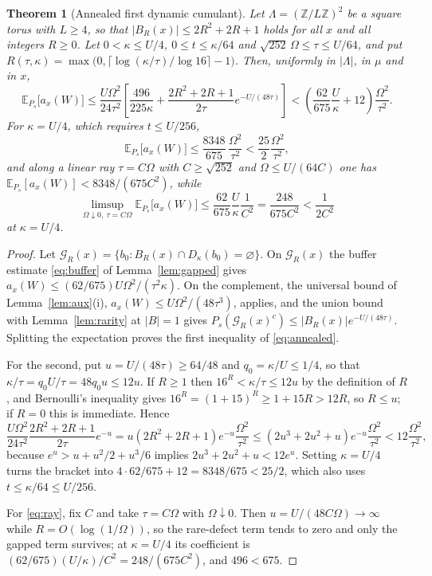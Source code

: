 \documentclass[11pt]{article}
\newtheorem{theorem}{Theorem}[section]
\theoremstyle{definition}
\theoremstyle{remark}
\newcommand{\E}{\mathbb{E}}
\begin{document}
\begin{theorem}[Annealed first dynamic cumulant]
\label{thm:annealed}
Let $\Lambda=(\mathbb{Z}/L\mathbb{Z})^2$ be a square torus with $L\ge4$, so that
$|B_R(x)|\le2R^2+2R+1$ holds for all $x$ and all integers $R\ge0$. Let
$0<\kappa\le U/4$, $0\le t\le\kappa/64$ and $\sqrt{252}\,\Omega\le\tau\le U/64$, and
put $R(\tau,\kappa)=\max\bigl(0,\lceil\log(\kappa/\tau)/\log16\rceil-1\bigr)$. Then,
uniformly in $|\Lambda|$, in $\mu$ and in $x$,
\begin{equation}
\E_{P_s}\bigl[a_x(W)\bigr]
\le\frac{U\Omega^2}{24\tau^2}\left[\frac{496}{225\kappa}
+\frac{2R^2+2R+1}{2\tau}e^{-U/(48\tau)}\right]
<\left(\frac{62}{675}\frac{U}{\kappa}+12\right)\frac{\Omega^2}{\tau^2}.
\label{eq:annealed}
\end{equation}
For $\kappa=U/4$, which requires $t\le U/256$,
\begin{equation}
\E_{P_s}\bigl[a_x(W)\bigr]\le\frac{8348}{675}\,\frac{\Omega^2}{\tau^2}<\frac{25}{2}\frac{\Omega^2}{\tau^2},
\label{eq:annealed4}
\end{equation}
and along a linear ray $\tau=C\Omega$ with $C\ge\sqrt{252}$ and $\Omega\le U/(64C)$
one has $\E_{P_s}[a_x(W)]<8348/(675C^2)$, while
\begin{equation}
\limsup_{\Omega\downarrow0,\ \tau=C\Omega}\E_{P_s}\bigl[a_x(W)\bigr]
\le\frac{62}{675}\frac{U}{\kappa}\frac{1}{C^2}=\frac{248}{675C^2}<\frac{1}{2C^2}
\label{eq:ray}
\end{equation}
at $\kappa=U/4$.
\end{theorem}

\begin{proof}
Let $\mathcal{G}_R(x)=\{b_0:B_R(x)\cap D_\kappa(b_0)=\varnothing\}$. On
$\mathcal{G}_R(x)$ the buffer estimate \eqref{eq:buffer} of
Lemma~\ref{lem:gapped} gives $a_x(W)\le(62/675)U\Omega^2/(\tau^2\kappa)$. On the
complement, the universal bound of Lemma~\ref{lem:aux}(i),
$a_x(W)\le U\Omega^2/(48\tau^3)$, applies, and the union bound with
Lemma~\ref{lem:rarity} at $|B|=1$ gives
$P_s(\mathcal{G}_R(x)^c)\le|B_R(x)|e^{-U/(48\tau)}$. Splitting the expectation
proves the first inequality of \eqref{eq:annealed}.

For the second, put $u=U/(48\tau)\ge64/48$ and $q_0=\kappa/U\le1/4$, so that
$\kappa/\tau=q_0U/\tau=48q_0u\le12u$. If $R\ge1$ then $16^R<\kappa/\tau\le12u$ by the
definition of $R$, and Bernoulli's inequality gives $16^R=(1+15)^R\ge1+15R>12R$, so
$R\le u$; if $R=0$ this is immediate. Hence
\[
\frac{U\Omega^2}{24\tau^2}\frac{2R^2+2R+1}{2\tau}e^{-u}
=u(2R^2+2R+1)e^{-u}\frac{\Omega^2}{\tau^2}
\le(2u^3+2u^2+u)e^{-u}\frac{\Omega^2}{\tau^2}<12\frac{\Omega^2}{\tau^2},
\]
because $e^u>u+u^2/2+u^3/6$ implies $2u^3+2u^2+u<12e^u$. Setting $\kappa=U/4$
turns the bracket into $4\cdot62/675+12=8348/675<25/2$, which also uses
$t\le\kappa/64\le U/256$.

For \eqref{eq:ray}, fix $C$ and take $\tau=C\Omega$ with $\Omega\downarrow0$. Then
$u=U/(48C\Omega)\to\infty$ while $R=O(\log(1/\Omega))$, so the rare-defect term
tends to zero and only the gapped term survives; at $\kappa=U/4$ its coefficient is
$(62/675)(U/\kappa)/C^2=248/(675C^2)$, and $496<675$.
\end{proof}
\end{document}
